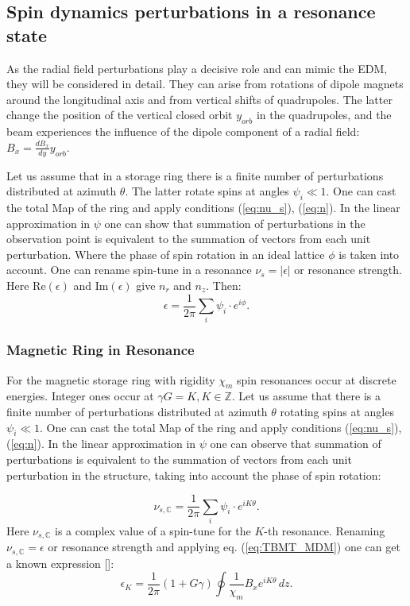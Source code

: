 \subsection{Spin dynamics perturbations in a resonance state}
As the radial field perturbations play a decisive role and can mimic the EDM, they will be considered in detail.
They can arise from rotations of dipole magnets around the longitudinal axis and from vertical shifts of quadrupoles. The latter change the position of the vertical closed orbit $y_{orb}$ in the quadrupoles, and the beam experiences the influence of the dipole component of a radial field: $B_x=\frac{dB_x}{dy}y_{orb}$.\par
Let us assume that in a storage ring there is a finite number of perturbations distributed at azimuth $\theta$. The latter rotate spins at angles $\psi_i\ll 1$. One can cast the total Map of the ring and apply conditions (\ref{eq:nu_s}), (\ref{eq:n}). In the linear approximation in $\psi$ one can show that summation of perturbations in the observation point is equivalent to the summation of vectors from each unit perturbation. Where the phase of spin rotation in an ideal lattice $\phi$ is taken into account. One can rename spin-tune in a resonance $\nu_{s}=|\epsilon|$ or resonance strength. Here $\mathrm{Re}(\epsilon)$ and $\mathrm{Im}(\epsilon)$ give $n_r$ and $n_z$. Then:
\begin{equation}\label{eq:nu_s_Magn}
\epsilon=\frac{1}{2\pi}\sum_{i}^{}{\psi_i\cdot e^{i\phi}}.
\end{equation}


\iffalse
\subsubsection{Magnetic Ring in Resonance}
For the magnetic storage ring with rigidity $\chi_m$ spin resonances occur at discrete energies. Integer ones occur at $\gamma G=K, K\in \mathbb{Z}$. Let us assume that there is a finite number of perturbations distributed at azimuth $\theta$ rotating spins at angles $\psi_i\ll 1$. One can cast the total Map of the ring and apply conditions (\ref{eq:nu_s}), (\ref{eq:n}). In the linear approximation in $\psi$ one can observe that summation of perturbations is equivalent to the summation of vectors from each unit perturbation in the structure, taking into account the phase of spin rotation:


\begin{equation}\label{eq:nu_s_Magn}
\nu_{s,\mathbb{C}}=\frac{1}{2\pi}\sum_{i}^{}{\psi_i\cdot e^{iK\theta}}.
\end{equation}
Here $\nu_{s,\mathbb{C}}$ is a complex value of a spin-tune for the $K$-th resonance. Renaming $\nu_{s,\mathbb{C}}=\epsilon$ or resonance strength and applying eq. (\ref{eq:TBMT_MDM}) one can get a known expression []:
\begin{equation}\label{eq:nu_s_Magn1}
\epsilon_K=\frac{1}{2\pi}(1+G\gamma)\oint\frac{1}{\chi_m}B_xe^{iK\theta}\, dz.
\end{equation}

